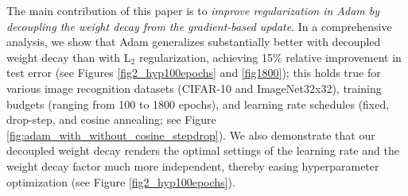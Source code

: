 \documentclass[usenames,dvipsnames]{article} %
\newcommand{\franknips}[1]{\textcolor{black}{#1}}
\begin{document}
The main contribution of this paper is to \emph{improve regularization in Adam by decoupling the weight decay from the gradient-based update}. In a comprehensive analysis, we show that Adam generalizes substantially better with decoupled weight decay than with L$_2$ regularization, achieving 15\% relative improvement in test error (see Figures \ref{fig2_hyp100epochs} and \ref{fig1800}); this holds true for various image recognition datasets (CIFAR-10 and ImageNet32x32), training budgets (ranging from 100 to 1800 epochs), and learning rate schedules (fixed, drop-step, and cosine annealing; see Figure \ref{fig:adam_with_without_cosine_stepdrop}).
%
We also demonstrate that our decoupled weight decay renders the optimal settings of the learning rate and the weight decay factor much more independent, thereby easing hyperparameter optimization (see Figure \ref{fig2_hyp100epochs}). 




%


\end{document}
